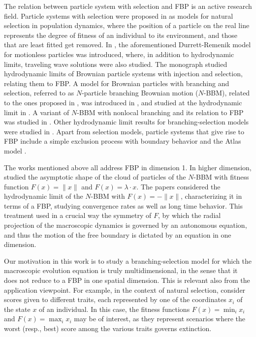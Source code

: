 \documentclass[11pt]{amsart}
\theoremstyle{plain}
\newcommand{\la}{\lambda}
\newcommand{\F}{F}
\begin{document}
The relation between particle system with selection and FBP is an active research field. Particle systems with selection were proposed in \cite{bru06, bru07} as models for natural selection in population dynamics, where the position of a particle on the real line represents the degree of fitness of an individual to its environment, and those that are least fitted get removed. In \cite{dur11}, the aforementioned Durrett-Remenik model for motionless particles was introduced, where, in addition to hydrodynamic limits, traveling wave solutions were also studied.
The monograph \cite{de-masi-book} studied hydrodynamic limits of Brownian particle systems with injection and selection, relating them to FBP. A model for Brownian particles with branching and selection, referred to as $N$-particle branching Brownian motion ($N$-BBM), related to the ones proposed in \cite{bru06, bru07}, was introduced in \cite{mai16}, and studied at the hydrodynamic limit in \cite{de-masi-nbbm, ber19}. A variant of $N$-BBM with nonlocal branching and its relation to FBP was studied in \cite{de-masi-nbbm2}. Other hydrodynamic limit results for branching-selection models were studied in \cite{groisman2021rank, ata25}. Apart from selection models, particle systems that give rise to FBP include a simple exclusion process with boundary behavior \cite{de-masi-excl} and the Atlas model \cite{dem19, ata-bud-25}.

The works mentioned above all address FBP in dimension 1.
In higher dimension, \cite{n.ber18} studied the asymptotic shape
of the cloud of particles of the $N$-BBM with fitness function $\F(x)=\|x\|$ and
$\F(x)=\la\cdot x$. The papers \cite{ber21, ber22bee} considered
the hydrodynamic limit of the $N$-BBM with $\F(x)=-\|x\|$,
characterizing it in terms of a FBP, studying convergence rates
as well as long time behavior.
This treatment used in a crucial way the symmetry of $\F$,
by which the radial projection of the macroscopic dynamics
is governed by an autonomous equation, and thus the motion of the free boundary
is dictated by an equation in one dimension.

Our motivation in this work is to study a branching-selection model for which the macroscopic evolution equation is truly multidimensional, in the sense that it does not reduce to a FBP in one spatial dimension.
This is relevant also from the application viewpoint. For example, in the context of natural selection, consider scores given to different traits, each represented by one of the coordinates $x_i$ of the state $x$ of an individual. In this case, the fitness functions $F(x)=\min_i x_i$ and $F(x)=\max_ix_i$ may be of interest, as they represent scenarios where the worst (resp., best) score among the various traits governs extinction.
\end{document}
